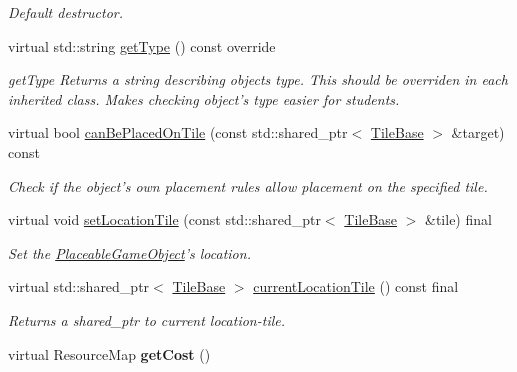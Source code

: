 \begin{DoxyCompactItemize}
\begin{DoxyCompactList}\small\item\em Default destructor. \end{DoxyCompactList}\item 
virtual std\-::string \hyperlink{class_course_1_1_placeable_game_object_adcd0c91b52ccedd434092380644f210e}{get\-Type} () const override
\begin{DoxyCompactList}\small\item\em get\-Type Returns a string describing objects type. This should be overriden in each inherited class. Makes checking object's type easier for students. \end{DoxyCompactList}\item 
virtual bool \hyperlink{class_course_1_1_placeable_game_object_a09616c1b271c35df61c88b37d0b85968}{can\-Be\-Placed\-On\-Tile} (const std\-::shared\-\_\-ptr$<$ \hyperlink{class_course_1_1_tile_base}{Tile\-Base} $>$ \&target) const 
\begin{DoxyCompactList}\small\item\em Check if the object's own placement rules allow placement on the specified tile. \end{DoxyCompactList}\item 
virtual void \hyperlink{class_course_1_1_placeable_game_object_a22dcc18962f81c27ac0a176b37533ff4}{set\-Location\-Tile} (const std\-::shared\-\_\-ptr$<$ \hyperlink{class_course_1_1_tile_base}{Tile\-Base} $>$ \&tile) final
\begin{DoxyCompactList}\small\item\em Set the \hyperlink{class_course_1_1_placeable_game_object}{Placeable\-Game\-Object}'s location. \end{DoxyCompactList}\item 
virtual std\-::shared\-\_\-ptr$<$ \hyperlink{class_course_1_1_tile_base}{Tile\-Base} $>$ \hyperlink{class_course_1_1_placeable_game_object_a860e49fae06b1f58641d9ff373d46fdf}{current\-Location\-Tile} () const final
\begin{DoxyCompactList}\small\item\em Returns a shared\-\_\-ptr to current location-\/tile. \end{DoxyCompactList}\item 
\hypertarget{class_course_1_1_placeable_game_object_a25eb46ff8489b49a302f164f1ea5eb28}{virtual Resource\-Map {\bfseries get\-Cost} ()}\label{class_course_1_1_placeable_game_object_a25eb46ff8489b49a302f164f1ea5eb28}

\end{DoxyCompactItemize}
